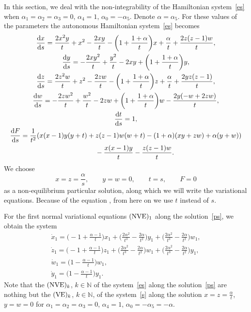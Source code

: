 \documentclass[pdftex]{sigma}
\numberwithin{equation}{section}
\begin{document}
 In this section, we deal with the non-integrability of the Hamiltonian system~\eqref{es} when
 $\alpha_1=\alpha_2=\alpha_3=0$, $\alpha_4=1$, $\alpha_0=-\alpha_5$. Denote $\alpha=\alpha_5$. For these values of the parameters
 the autonomous Hamiltonian system~\eqref{es} becomes
 \begin{gather*}
 \frac{{\rm d} x}{{\rm d} s}
 =
 \frac{2 x^2 y}{t} + x^2 - \frac{2 x y}{t}
 -\biggl(1 + \frac{1+\alpha}{t}\biggr) x + \frac{\alpha}{t}
 + \frac{2 z (z-1) w }{t},\\
 \frac{{\rm d} y}{{\rm d} s} =
 -\frac{2 x y^2}{t} + \frac{y^2}{t} - 2 x y
 +\biggl(1 + \frac{1+\alpha}{t}\biggr) y ,\\
 \frac{{\rm d} z}{{\rm d} s} =
 \frac{2 z^2 w}{t} + z^2 - \frac{2 z w}{t}
 -\biggl(1 + \frac{1+\alpha}{t}\biggr) z + \frac{\alpha}{t}
 + \frac{2 y z (z-1)}{t},\\
 \frac{{\rm d} w}{{\rm d} s} =
 -\frac{2 z w^2}{t} + \frac{w^2}{t} - 2 z w
 +\biggl(1 + \frac{1+\alpha}{t}\biggr) w -
 \frac{2 y (-w + 2 z w )}{t}, \\
 \frac{{\rm d} t}{{\rm d} s} =
 1, \\
 \frac{{\rm d} F}{{\rm d} s} =
 \frac{1}{t^2} (x (x-1) y (y+t) + z (z-1) w (w+t) - (1+\alpha) (x y + z w)
 + \alpha (y+w)) \\
 \hphantom{\frac{{\rm d} F}{{\rm d} s} =}{} - \frac{x (x-1) y}{t} - \frac{z (z-1) w}{t} .
 \end{gather*}
 We choose
 \begin{equation}
 x=z=\frac{\alpha}{s}, \qquad y=w=0, \qquad t=s, \qquad F=0\label{ps}
 \end{equation}
 as a non-equilibrium particular solution, along which we will write the variational equations. Because of the equation
 , from here on we use $t$ instead of $s$.

 For the first normal variational equations $({\rm NVE})_1$ along the solution~\eqref{ps}, we obtain the system
 \begin{gather}
 \dot{x}_1 =
 \biggl(-1 + \frac{\alpha-1}{t}\biggr) x_1 + \biggl(\frac{2 \alpha^2}{t^3} - \frac{2 \alpha}{t^2}\biggr) y_1
 + \biggl(\frac{2 \alpha^2}{t^3} - \frac{2 \alpha}{t^2}\biggr) w_1,\nonumber\\
 \dot{z}_1 =
 \biggl(-1 + \frac{\alpha-1}{t} \biggr) z_1 +
 \biggl(\frac{2 \alpha^2}{t^3} - \frac{2 \alpha}{t^2}\biggr) w_1
 + \biggl(\frac{2 \alpha^2}{t^3} - \frac{2 \alpha}{t^2}\biggr) y_1,\nonumber\\
 \dot{w}_1 =
 \biggl(1 - \frac{\alpha-1}{t}\biggr) w_1,\nonumber\\
 \dot{y}_1 =
 \biggl(1 - \frac{ \alpha -1}{t} \biggr) y_1 .\label{fve}
 \end{gather}
 Note that the $({\rm NVE})_k$, $k\in\mathbb{N}$ of the system~\eqref{es} along the solution~\eqref{ps} are nothing but the $({\rm VE})_k$, $k\in\mathbb{N}$, of the
 system~\eqref{s} along the solution $x=z=\frac{\alpha}{t}$, $y=w=0$ for ${\alpha_1=\alpha_2=\alpha_3=0}$, $\alpha_4=1$, $\alpha_0=-\alpha_5=-\alpha$.
\end{document}
